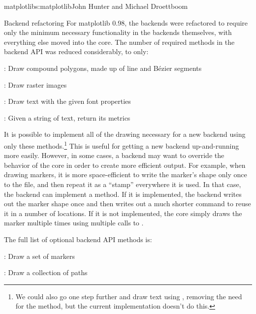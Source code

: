 \begin{aosachapter}{matplotlib}{s:matplotlib}{John Hunter and Michael Droettboom}
\begin{aosasect1}{Backend refactoring}
For matplotlib 0.98, the backends were refactored to require only the
minimum necessary functionality in the backends themselves, with
everything else moved into the core.  The number of required methods
in the backend API was reduced considerably, to only:

\begin{aosaitemize}

  \item {}: Draw compound polygons, made up of line and
    B\'ezier segments

  \item {}: Draw raster images

  \item {}: Draw text with the given font properties

  \item {}: Given a string of
    text, return its metrics

\end{aosaitemize}

It is possible to implement all of the drawing necessary for a new
backend using only these methods.\footnote{We could also go one step
  further and draw text using , removing the need for
  the  method, but the current implementation doesn't
  do this.}  This is useful for getting a new backend up-and-running
more easily.  However, in some cases, a backend may want to override
the behavior of the core in order to create more efficient output.
For example, when drawing markers, it is more space-efficient to write
the marker's shape only once to the file, and then repeat it as a
``stamp'' everywhere it is used.  In that case, the backend can
implement a  method.  If it is implemented, the
backend writes out the marker shape once and then writes out a much
shorter command to reuse it in a number of locations.  If it is not
implemented, the core simply draws the marker multiple times using
multiple calls to .

The full list of optional backend API methods is:

\begin{aosaitemize}

  \item {}: Draw a set of markers

  \item {}: Draw a collection of paths


\end{aosaitemize}
\end{aosasect1}
\end{aosachapter}

